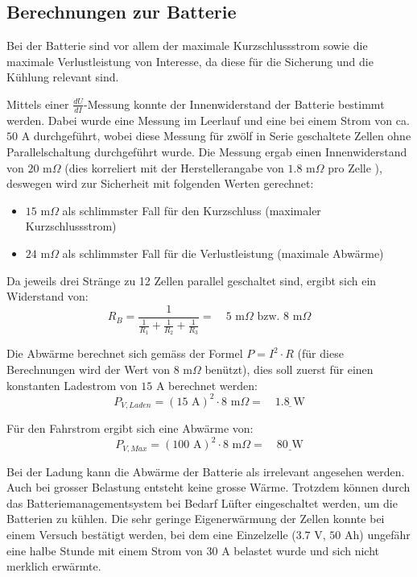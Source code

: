 \subsection{Berechnungen zur Batterie}
Bei der Batterie sind vor allem der maximale Kurzschlussstrom sowie die maximale Verlustleistung von Interesse, da diese für die Sicherung und die Kühlung relevant sind.

Mittels einer $\frac{dU}{dI}$-Messung konnte der Innenwiderstand der Batterie bestimmt werden. Dabei wurde eine Messung im Leerlauf und eine bei einem Strom von ca. $50$ A durchgeführt, wobei diese Messung für zwölf in Serie geschaltete Zellen ohne Parallelschaltung durchgeführt wurde. Die Messung ergab einen Innenwiderstand von $20$ m$\Omega$ (dies korreliert mit der Herstellerangabe von $1.8$ m$\Omega$ pro Zelle \cite{lev50}), deswegen wird zur Sicherheit mit folgenden Werten gerechnet:
\begin{itemize}
	\item $15$ m$\Omega$ als schlimmster Fall für den Kurzschluss (maximaler Kurzschlussstrom)
	\item $24$ m$\Omega$ als schlimmster Fall für die Verlustleistung (maximale Abwärme)
\end{itemize}

Da jeweils drei Stränge zu 12 Zellen parallel geschaltet sind, ergibt sich ein Widerstand von:
\begin{equation*}
	R_B=\frac{1}{\frac{1}{R_1}+\frac{1}{R_2}+\frac{1}{R_3}}=\quad 5\text{ m}\Omega\text{ bzw. } 8\text{ m}\Omega
\end{equation*}

Die Abwärme berechnet sich gemäss der Formel $P=I^2\cdot R$ (für diese Berechnungen wird der Wert von $8$ m$\Omega$ benützt), dies soll zuerst für einen konstanten Ladestrom von $15$ A berechnet werden:
\begin{equation*}
	P_{V,Laden}=\left(15\text{ A}\right)^2\cdot8\text{ m}\Omega=\quad\underline{1.8\text{ W}}
\end{equation*}

Für den Fahrstrom ergibt sich eine Abwärme von:
\begin{equation*}
	P_{V,Max}=\left(100\text{ A}\right)^2\cdot8\text{ m}\Omega=\quad\underline{80\text{ W}}
\end{equation*}

Bei der Ladung kann die Abwärme der Batterie als irrelevant angesehen werden. Auch bei grosser Belastung entsteht keine grosse Wärme. Trotzdem können durch das Batteriemanagementsystem bei Bedarf Lüfter eingeschaltet werden, um die Batterien zu kühlen. Die sehr geringe Eigenerwärmung der Zellen konnte bei einem Versuch bestätigt werden, bei dem eine Einzelzelle ($3.7$ V, $50$ Ah) ungefähr eine halbe Stunde mit einem Strom von $30$ A belastet wurde und sich nicht merklich erwärmte.

